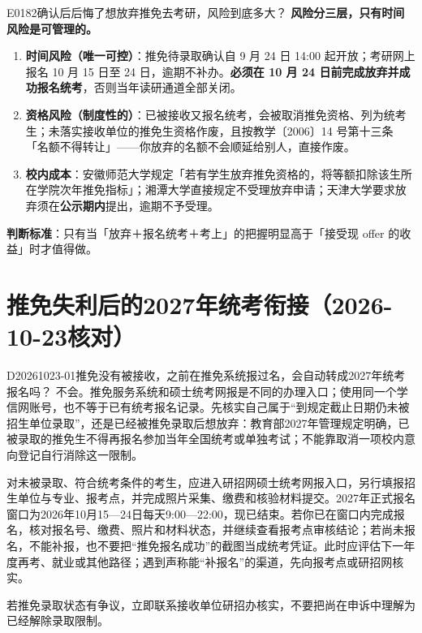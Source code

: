 \begin{qa}{E0182}{确认后后悔了想放弃推免去考研，风险到底多大？}
\textbf{风险分三层，只有时间风险是可管理的。}
\begin{enumerate}
  \item \textbf{时间风险（唯一可控）}：推免待录取确认自 9 月 24 日 14:00 起开放；考研网上报名 10 月 15 日至 24 日，逾期不补办。\textbf{必须在 10 月 24 日前完成放弃并成功报名统考}，否则当年读研通道全部关闭。
  \item \textbf{资格风险（制度性的）}：已被接收又报名统考，会被取消推免资格、列为统考生；未落实接收单位的推免生资格作废，且按教学〔2006〕14 号第十三条「名额不得转让」——你放弃的名额不会顺延给别人，直接作废。
  \item \textbf{校内成本}：安徽师范大学规定「若有学生放弃推免资格的，将等额扣除该生所在学院次年推免指标」；湘潭大学直接规定不受理放弃申请；天津大学要求放弃须在\textbf{公示期内}提出，逾期不予受理。
\end{enumerate}

\textbf{判断标准}：只有当「放弃＋报名统考＋考上」的把握明显高于「接受现 offer 的收益」时才值得做。
\end{qa}


\section{推免失利后的2027年统考衔接（2026-10-23核对）}

\begin{qa}{D20261023-01}{推免没有被接收，之前在推免系统报过名，会自动转成2027年统考报名吗？}
不会。推免服务系统和硕士统考网报是不同的办理入口；使用同一个学信网账号，也不等于已有统考报名记录。先核实自己属于“到规定截止日期仍未被招生单位录取”，还是已经被推免录取后想放弃：教育部2027年管理规定明确，已被录取的推免生不得再报名参加当年全国统考或单独考试；不能靠取消一项校内意向登记自行消除这一限制。

对未被录取、符合统考条件的考生，应进入研招网硕士统考网报入口，另行填报招生单位与专业、报考点，并完成照片采集、缴费和核验材料提交。2027年正式报名窗口为2026年10月15—24日每天9:00—22:00，现已结束。若你已在窗口内完成报名，核对报名号、缴费、照片和材料状态，并继续查看报考点审核结论；若尚未报名，不能补报，也不要把“推免报名成功”的截图当成统考凭证。此时应评估下一年度再考、就业或其他路径；遇到声称能“补报名”的渠道，先向报考点或研招网核实。

若推免录取状态有争议，立即联系接收单位研招办核实，不要把尚在申诉中理解为已经解除录取限制。
\end{qa}

